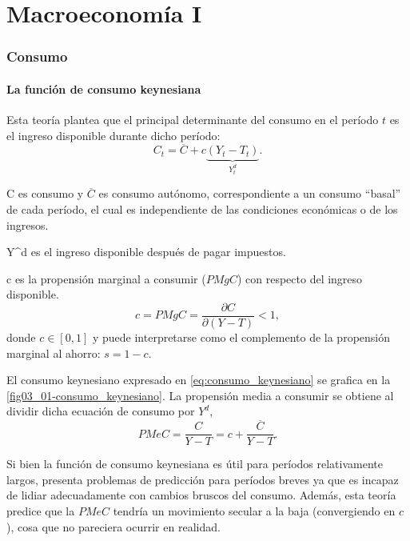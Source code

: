 \documentclass[DeGregorioResumen]{subfiles}
\begin{document}
\part*{Macroeconomía I}
\section{Consumo}
\subsection{La función de consumo keynesiana}
Esta teoría plantea que el principal determinante del consumo en el período $t$ es el ingreso disponible durante dicho período:
\begin{equation}
C_t=\overline{C}+c\underbrace{(Y_t-T_t)}_{Y^d_t}.
\label{eq:consumo_keynesiano}
\end{equation}
\begin{where}
\item[C] es consumo y $\overline{C}$ es consumo autónomo, correspondiente a un consumo ``basal'' de cada período, el cual es independiente de las condiciones económicas o de los ingresos.
\item[Y^d] es el ingreso disponible después de pagar impuestos.
\item[c] es la propensión marginal a consumir ($PMgC $) con respecto del ingreso disponible.
\begin{equation*}
c=PMgC=\frac{\partial C}{ \partial (Y-T)} < 1,
\end{equation*} 
donde $c \in [0,1]$ y puede interpretarse como el complemento de la propensión marginal al ahorro: $s=1-c$.
\end{where}

El consumo keynesiano expresado en \eqref{eq:consumo_keynesiano} se grafica en la \autoref{fig03_01-consumo_keynesiano}. La propensión media a consumir se obtiene al dividir dicha ecuación de consumo por $Y^d$,
\begin{equation*}
PMeC=\frac{C}{Y-T}=c+\frac{\overline{C}}{Y-T}.
\end{equation*}



Si bien la función de consumo keynesiana es útil para períodos relativamente largos, presenta problemas de predicción para períodos breves ya que es incapaz de lidiar adecuadamente con cambios bruscos del consumo. Además, esta teoría predice que la $PMeC$ tendría un movimiento secular a la baja (convergiendo en $c$), cosa que no pareciera ocurrir en realidad.
\end{document}

